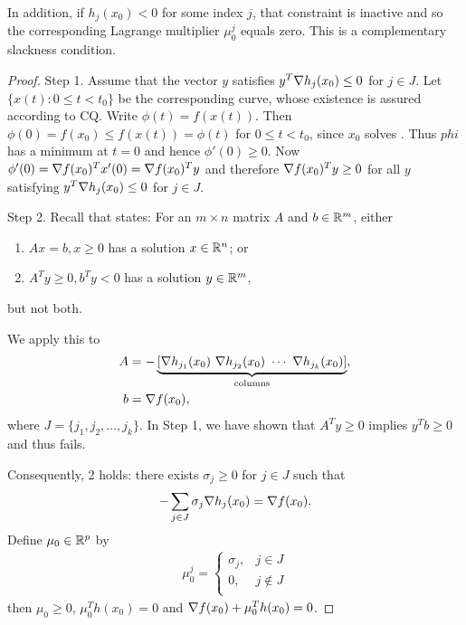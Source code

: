 In addition, if $h_j(x_0) < 0$ for some index $j$, that constraint is inactive and so the corresponding Lagrange multiplier $\mu_0^j$ equals zero.
This is a complementary slackness condition.

\begin{proof}
Step 1.
Assume that the vector $y$ satisfies $y^T \nabla h_j(x_0) \le 0$ for $j \in J$.
Let $\{ x(t) : 0 \le t < t_0 \}$ be the corresponding curve, whose existence is assured according to CQ.
Write $\phi(t) = f(x(t))$.
Then $\phi(0) = f(x_0) \le f(x(t)) = \phi(t)$ for $0 \le t < t_0$, since $x_0$ solves .
Thus $phi$ has a minimum at $t = 0$ and hence $\phi'(0) \ge 0$.
Now $\phi'(0) = \nabla f(x_0) ^T x'(0) = \nabla f(x_0) ^T y$ and therefore $\nabla f(x_0) ^T y \ge 0$ for all $y$ satisfying $y^T \nabla h_j(x_0) \le 0$ for $j \in J$. 

Step 2.
Recall that  states:
For an $m \times n$ matrix $A$ and $b \in \mathbb{R}^m$, either 
\begin{enumerate}
    \item $A x = b, x \ge 0$ has a solution $x \in \mathbb{R}^n$; or
    \item $A^T y \ge 0, b^T y < 0$ has a solution $y \in \mathbb{R}^m$,
\end{enumerate}
but not both.

We apply this to 
\begin{align}
A &= - \underbrace{[\grad h_{j_1} (x_0) \ \grad h_{j_2} (x_0)\ \cdots \ \grad h_{j_k} (x_0) ]}_{\text{columns}}, \\
b &= \grad f(x_0),
\end{align}
where $J = \{j_1, j_2, \dots, j_k\}$.
In Step 1, we have shown that $A^T y \ge 0$ implies $y^T b \ge 0$ and thus fails.

Consequently, 2 holds: there exists $\sigma_j \ge 0$ for $j \in J$ such that 
\begin{align}
- \sum_{j \in J} \sigma_j \nabla h_j(x_0) = \nabla f(x_0).
\end{align}
Define $\mu _0 \in \mathbb{R}^p$ by
\begin{align}
\mu_0^j = \begin{cases}
\sigma_j, & j \in J \\
0, & j \notin J \\
\end{cases}
\end{align}
then $\mu_0 \ge 0$, $\mu_0^T h(x_0) = 0$ and $ \nabla f(x_0) + \mu_0^T h(x_0) = 0$.
\end{proof}


